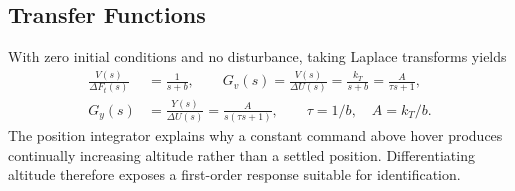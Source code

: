 \subsection{Transfer Functions}
With zero initial conditions and no disturbance, taking Laplace transforms yields
\begin{align}
\frac{V(s)}{\Delta F_t(s)}&=\frac1{s+b},\qquad
G_v(s)=\frac{V(s)}{\Delta U(s)}=\frac{k_T}{s+b}=\frac{A}{\tau s+1},\label{eq:velocityplant}\\
G_y(s)&=\frac{Y(s)}{\Delta U(s)}=\frac{A}{s(\tau s+1)},\qquad \tau=1/b,\quad A=k_T/b.\label{eq:plant}
\end{align}
The position integrator explains why a constant command above hover produces continually increasing altitude rather than a settled position. Differentiating altitude therefore exposes a first-order response suitable for identification.
\page

